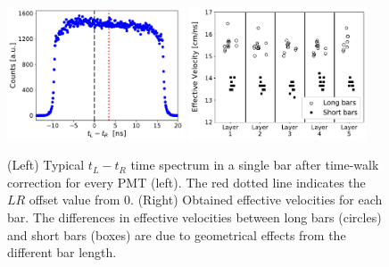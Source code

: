 \documentclass[3p,final,twocolumn]{elsarticle}
\begin{document}
\begin{figure}[tb]
	\centering
		\includegraphics[width=0.47\textwidth]{lr-offset.pdf}
		\includegraphics[width=0.47\textwidth]{eff_vel.pdf}
	\caption{
	(Left) Typical $t_{L} - t_{R}$ time spectrum in a single bar after time-walk correction for every PMT (left). The red dotted line indicates the $LR$ offset value from 0. (Right) Obtained effective velocities for each bar. The differences in effective velocities between long bars (circles) and short bars (boxes) are due to geometrical effects from the different bar length.}
	\label{fig:eff_vel}
\end{figure}

\end{document}
